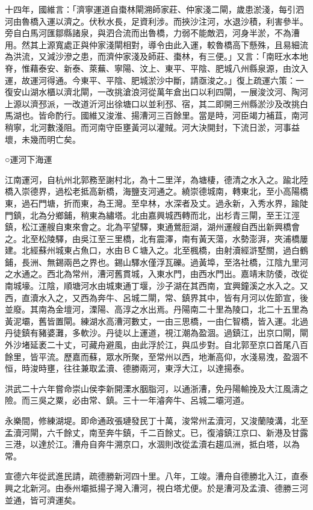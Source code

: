 十四年，國維言：「濟寧運道自棗林閘溯師家莊、仲家淺二閘，歲患淤淺，每引泗河由魯橋入運以濟之。伏秋水長，足資利涉。而挾沙注河，水退沙積，利害參半。旁自白馬河匯鄒縣諸泉，與泗合流而出魯橋，力弱不能敵泗，河身半淤，不為漕用。然其上源寬處正與仲家淺閘相對，導令由此入運，較魯橋高下懸殊，且易細流為洪流，又減沙滲之患，而濟仲家淺及師莊、棗林，有三便。」又言：「南旺水本地脊，惟藉泰安、新泰、萊蕪、寧陽、汶上、東平、平陰、肥城八州縣泉源，由汶入運，故運河得通。今東平、平陰、肥城淤沙中斷，請亟浚之。」復上疏運六策：一復安山湖水櫃以濟北閘，一改挑滄浪河從萬年倉出口以利四閘，一展浚汶河、陶河上源以濟邳派，一改道沂河出徐塘口以並利邳、宿，其二即開三州縣淤沙及改挑白馬湖也。皆命酌行。國維又浚淮、揚漕河三百餘里。當是時，河臣竭力補苴，南河稍寧，北河數淺阻。而河南守臣壅黃河以灌賊。河大決開封，下流日淤，河事益壞，未幾而明亡矣。


○運河下海運

江南運河，自杭州北郭務至謝村北，為十二里洋，為塘棲，德清之水入之。踰北陸橋入崇德界，過松老抵高新橋，海鹽支河通之。繞崇德城南，轉東北，至小高陽橋東，過石門塘，折而東，為王灣。至皁林，水深者及丈。過永新，入秀水界，踰陡門鎮，北為分鄉鋪，稍東為繡塔。北由嘉興城西轉而北，出杉青三閘，至王江涇鎮，松江運艘自東來會之。北為平望驛，東通鶯脰湖，湖州運艘自西出新興橋會之。北至松陵驛，由吳江至三里橋，北有震澤，南有黃天蕩，水勢澎湃，夾浦橋屢建。北經蘇州城東占魚口，水由ＢＣ塘入之。北至楓橋，由射瀆經滸墅關，過白鶴鋪，長洲、無錫兩邑之界也。錫山驛水僅浮瓦礫。過黃埠，至洛社橋，江陰九里河之水通之。西北為常州，漕河舊貫城，入東水門，由西水門出。嘉靖末防倭，改從南城壕。江陰，順塘河水由城東通丁堰，沙子湖在其西南，宜興鐘溪之水入之。又西，直瀆水入之，又西為奔牛、呂城二閘，常、鎮界其中，皆有月河以佐節宣，後並廢。其南為金壇河，溧陽、高淳之水出焉。丹陽南二十里為陵口，北二十五里為黃泥壩，舊皆置閘。練湖水高漕河數丈，一由三思橋，一由仁智橋，皆入運。北過丹徒鎮有豬婆灘，多軟沙。丹徒以上運道，視江潮為盈涸。過鎮江，出京口閘，閘外沙堵延袤二十丈，可藏舟避風，由此浮於江，與瓜步對。自北郭至京口首尾八百餘里，皆平流。歷嘉而蘇，眾水所聚，至常州以西，地漸高仰，水淺易洩，盈涸不恒，時浚時壅，往往兼取孟瀆、德勝兩河，東浮大江，以達揚泰。

洪武二十六年嘗命崇山侯李新開溧水胭脂河，以通浙漕，免丹陽輸挽及大江風濤之險。而三吳之粟，必由常、鎮。三十一年濬奔牛、呂城二壩河道。

永樂間，修練湖堤。即命通政張璉發民丁十萬，浚常州孟瀆河，又浚蘭陵溝，北至孟瀆河閘，六千餘丈，南至奔牛鎮，千二百餘丈。已，復濬鎮江京口、新港及甘露三港，以達於江。漕舟自奔牛溯京口，水涸則改從孟瀆右趨瓜洲，抵白塔，以為常。

宣德六年從武進民請，疏德勝新河四十里。八年，工竣。漕舟自德勝北入江，直泰興之北新河。由泰州壩抵揚子灣入漕河，視白塔尤便。於是漕河及孟瀆、德勝三河並通，皆可濟運矣。

